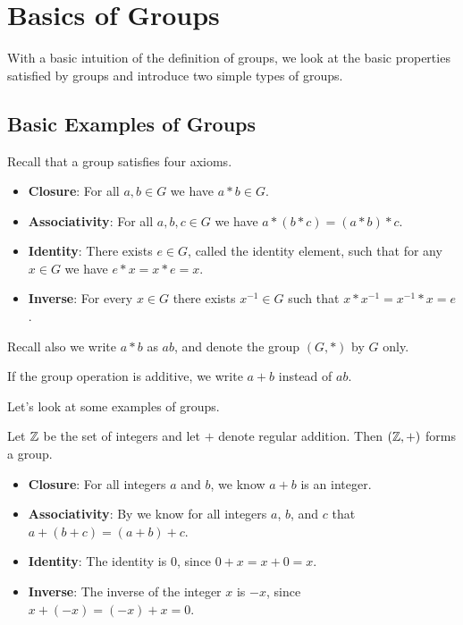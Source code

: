 \chapter{Basics of Groups}
With a basic intuition of the definition of groups, we look at the basic properties satisfied by groups and introduce two simple types of groups.

\section{Basic Examples of Groups}
Recall that a group satisfies four axioms.
\begin{itemize}
    \item \textbf{Closure}: For all $a, b \in G$ we have $a \ast b \in G$.
    \item \textbf{Associativity}: For all $a, b, c \in G$ we have $a \ast (b \ast c) = (a \ast b) \ast c$.
    \item \textbf{Identity}: There exists $e \in G$, called the identity element, such that for any $x \in G$ we have $e \ast x = x \ast e = x$.
    \item \textbf{Inverse}: For every $x \in G$ there exists $x^{-1} \in G$ such that $x \ast x^{-1} = x^{-1} \ast x = e$.
\end{itemize}

Recall also we write $a \ast b$ as $ab$, and denote the group $(G, \ast)$ by $G$ only.
\begin{remark}
    If the group operation is additive, we write $a + b$ instead of $ab$.
\end{remark}

Let's look at some examples of groups.
\begin{example}
    Let $\mathbb{Z}$ be the set of integers and let $+$ denote regular addition. Then $(\mathbb{Z}, +)$ forms a group.
    \begin{itemize}
        \item \textbf{Closure}: For all integers $a$ and $b$, we know $a + b$ is an integer.
        \item \textbf{Associativity}: By  we know for all integers $a$, $b$, and $c$ that $a + (b + c) = (a + b) + c$.
        \item \textbf{Identity}: The identity is 0, since $0 + x = x + 0 = x$.
        \item \textbf{Inverse}: The inverse of the integer $x$ is $-x$, since $x + (-x) = (-x) + x = 0$.
    \end{itemize}
\end{example}

